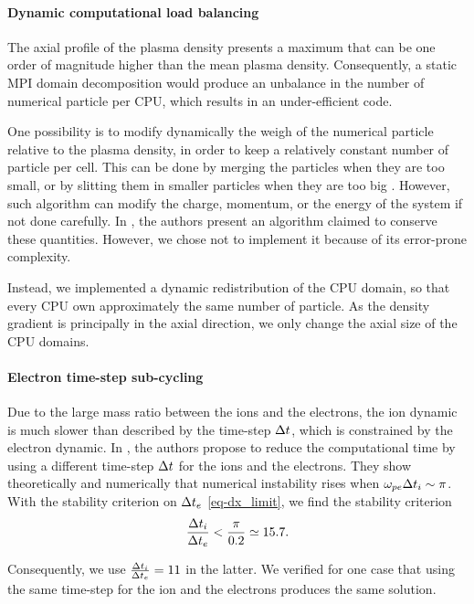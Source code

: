 \paragraph{Dynamic computational load balancing\\}
The axial profile of the plasma density presents a maximum that can be one order of magnitude higher than the mean plasma density.
Consequently, a static MPI domain decomposition would produce an unbalance in the number of numerical particle per CPU, which results in an under-efficient code.

One possibility is to modify dynamically the weigh of the numerical particle relative to the plasma density, in order to keep a relatively constant number of particle per cell.
This can be done by merging the particles when they are too small, or by slitting them in smaller particles when they are too big \citep{shon2001,teunissen2014}.
However, such algorithm can modify the charge, momentum, or the energy of the system if not done carefully.
In \citet{vranic2015}, the authors present an algorithm claimed to conserve these quantities.
However, we chose not to implement it because of its error-prone complexity.

Instead, we implemented a dynamic redistribution of the CPU domain, so that every CPU own approximately the same number of particle.
As the density gradient is principally in the axial direction, we only change the axial size of the CPU domains.

\paragraph{Electron time-step sub-cycling\\}
Due to the large mass ratio between the  ions and the electrons, the ion dynamic is much slower than described by the time-step $\Delta t$, which is constrained by the electron dynamic.
In \citet{adam1982}, the authors propose to reduce the computational time by using a different time-step $\Delta t$ for the ions and the electrons.
They show theoretically and numerically that numerical instability rises when $\omega_{pe} \Delta t_i  \sim \pi$.
With the stability criterion on $\Delta t_e$ \cref{eq-dx_limit}, we find the stability criterion 
\begin{equation} \label{eq-subcycling_criterion}
  \frac{\Delta t_i}{\Delta t_e} < \frac{\pi}{0.2} \simeq 15.7.
\end{equation}

Consequently, we use $\frac{\Delta t_i}{\Delta t_e} = 11$ in the latter.
We verified for one case that using the same time-step for the ion and the electrons produces the same solution.


